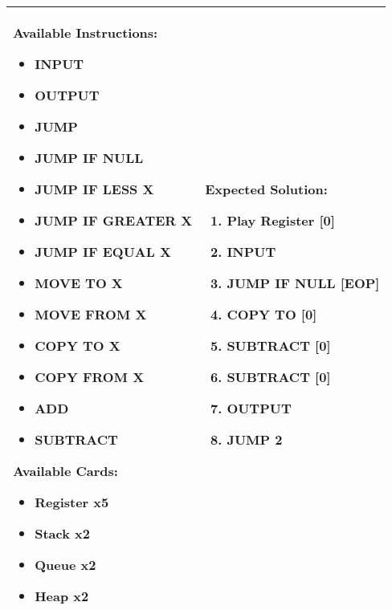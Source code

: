 \begin{center}
    \begin{tabular}{ | m{5cm} | m{9cm} | } 
        \hline
            \textbf{Available Instructions:} 
            \begin{itemize}
                \setlength\itemsep{-.35em}
                \item INPUT
                \item OUTPUT
                \item JUMP
                \item JUMP IF NULL
                \item JUMP IF LESS X
                \item JUMP IF GREATER X
		\item JUMP IF EQUAL X
                \item MOVE TO X
                \item MOVE FROM X
                \item COPY TO X
                \item COPY FROM X
		\item ADD
		\item SUBTRACT
            \end{itemize}
            \textbf{Available Cards:} 
            \begin{itemize}
                \setlength\itemsep{-.35em}
                \item Register x5
		\item Stack x2
                \item Queue x2
                \item Heap x2
            \end{itemize}& 
            \textbf{Expected Solution:} 
            \begin{enumerate}
                \setlength\itemsep{-.35em}
		\item Play Register [0]
                \item INPUT
		\item JUMP IF NULL [EOP]
		\item COPY TO [0]
		\item SUBTRACT [0]
		\item SUBTRACT [0]
		\item OUTPUT
		\item JUMP 2
            \end{enumerate}
            \\
        \hline
    \end{tabular}
\end{center}